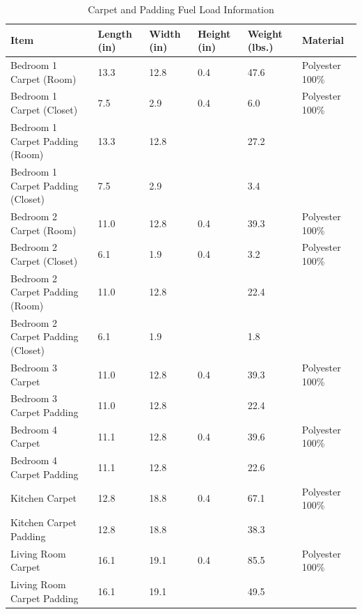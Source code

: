 \begin{table}[H]
\centering
\begin{tabular}{|L{0.23\textwidth}|C{0.08\textwidth}|C{0.08\textwidth}|C{0.08\textwidth}|C{0.08\textwidth}|L{0.25\textwidth}|}
\hline
Item 								&Length (in) 	&Width (in) 	&Height (in) 	&Weight (lbs.) 	&Material \\ \hline \hline
Bedroom 1 Carpet (Room) 			&13.3			&12.8			&0.4			&47.6			&Polyester 100\% \\ \hline
Bedroom 1 Carpet (Closet)			&7.5			&2.9			&0.4			&6.0			&Polyester 100\% \\ \hline
Bedroom 1 Carpet Padding (Room)		&13.3			&12.8			&				&27.2			& \\ \hline
Bedroom 1 Carpet Padding (Closet)	&7.5			&2.9			&				&3.4			& \\ \hline	 	 
Bedroom 2 Carpet (Room) 			&11.0			&12.8			&0.4			&39.3			&Polyester 100\% \\ \hline
Bedroom 2 Carpet (Closet)			&6.1			&1.9			&0.4			&3.2			&Polyester 100\% \\ \hline
Bedroom 2 Carpet Padding (Room)		&11.0			&12.8			&				&22.4			& \\ \hline
Bedroom 2 Carpet Padding (Closet)	&6.1			&1.9			&				&1.8			& \\ \hline	  
Bedroom 3 Carpet 					&11.0			&12.8			&0.4			&39.3			&Polyester 100\% \\ \hline
Bedroom 3 Carpet Padding 			&11.0			&12.8			&				&22.4			& \\ \hline	 
Bedroom 4 Carpet 					&11.1			&12.8			&0.4			&39.6			&Polyester 100\% \\ \hline
Bedroom 4 Carpet Padding 			&11.1			&12.8			&				&22.6			& \\ \hline	 
Kitchen Carpet 						&12.8			&18.8			&0.4			&67.1			&Polyester 100\% \\ \hline
Kitchen Carpet Padding 				&12.8			&18.8			&				&38.3			& \\ \hline	 
Living Room Carpet					&16.1			&19.1			&0.4			&85.5			&Polyester 100\% \\ \hline 
Living Room Carpet Padding 			&16.1			&19.1			&				&49.5			& \\ \hline	
\end{tabular}
\caption{Carpet and Padding Fuel Load Information}
\label{table:carpet_padding_fuel_weights}
\end{table}

